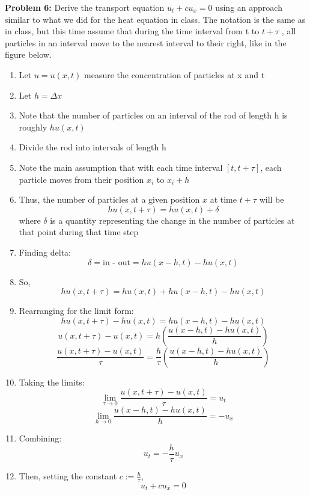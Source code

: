 \documentclass[12pt]{article}
\newcommand{\ans}[1]{\boxed{\text{#1}}}
\begin{document}
\pagebreak 
\textbf{Problem 6:} Derive the transport equation $u_t + cu_x = 0$ using an approach similar to what we did for the heat equation in class. The notation is the same as in class, but this time assume that during the time interval from t to $t + \tau$ , all particles in an interval move to the nearest interval to their right, like in the figure below.
\color{blue}
\begin{enumerate}
    \item Let $u = u(x, t)$ measure the concentration of particles at x and t
    \item Let $h = \Delta x$
    \item Note that the number of particles on an interval of the rod of length h is roughly $hu(x, t)$
    \item Divide the rod into intervals of length h 
    \item Note the main assumption that with each time interval $[t, t + \tau]$, each particle moves from their position $x_i$ to $x_i + h$
    \item Thus, the number of particles at a given position $x$ at time $t + \tau$ will be 
    \[hu(x, t + \tau) = hu(x, t) + \delta\]
    where $\delta$ is a quantity representing the change in the number of particles at that point during that time step
    \item Finding delta:
    \[\delta = \text{in - out} = hu(x - h, t) - hu(x, t)\]
    \item So, 
    \[hu(x, t + \tau) = hu(x, t) + hu(x - h, t) - hu(x, t) \]
    \item Rearranging for the limit form:
    \[hu(x, t + \tau) - hu(x, t) = hu(x - h, t) - hu(x, t) \]
    \[u(x, t + \tau) - u(x, t) = h\left(\frac{u(x - h, t) - hu(x, t)}{h}\right)\]
    \[\frac{u(x, t + \tau) - u(x, t)}{\tau} = \frac{h}{\tau}\left(\frac{u(x - h, t) - hu(x, t)}{h}\right)\]
    \item Taking the limits:
    \[\lim_{\tau \to 0} \frac{u(x, t + \tau) - u(x, t)}{\tau} = u_t\]
    \[\lim_{h\to 0} \frac{u(x - h, t) - hu(x, t)}{h} = -u_x\]
    \item Combining:
    \[u_t = -\frac{h}{\tau}u_x\]
    \item Then, setting the constant $c := \frac{h}{\tau}$, 
    \[\ans{$u_t + cu_x = 0$}\]
    
\end{enumerate}
\end{document}
